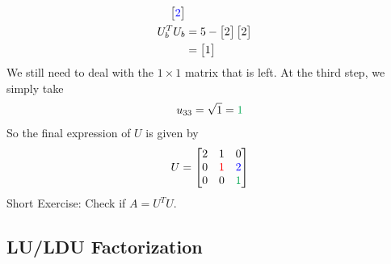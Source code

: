 \begin{exmp}
\begin{align*}
\begin{bmatrix}
\textcolor{blue}{2}
\end{bmatrix} \\
U_b^T U_b &=
5 - 
\begin{bmatrix}
2
\end{bmatrix}
\begin{bmatrix}
2
\end{bmatrix} \\
&= 
\begin{bmatrix}
1
\end{bmatrix}
\end{align*}
We still need to deal with the $1 \times 1$ matrix that is left. At the third step, we simply take
\begin{align*}
u_{33} = \sqrt{1} = \textcolor{Green}{1}
\end{align*}
So the final expression of $U$ is given by
\begin{align*}
U = 
\begin{bmatrix}
2 & 1 & 0 \\
0 & \textcolor{red}{1} & \textcolor{blue}{2} \\
0 & 0 & \textcolor{Green}{1}
\end{bmatrix}
\end{align*}
Short Exercise: Check if $A = U^T U$.
\end{exmp}

\subsection{LU/LDU Factorization}

